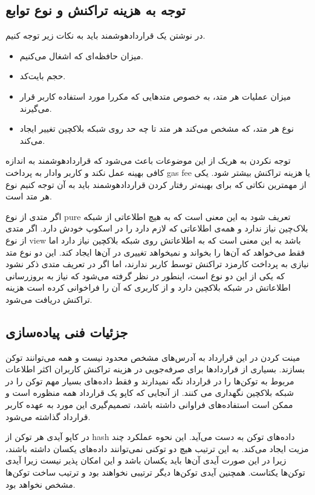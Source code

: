 \subsection{توجه به هزینه تراکنش و نوع توابع}
در نوشتن یک قراردادهوشمند باید به نکات زیر توجه کنیم.
\begin{itemize}
  \item
میزان حافظه‌ای که اشغال می‌کنیم.
  \item
حجم بایت‌کد.
  \item
میزان عملیات هر متد، به خصوص متدهایی که مکررا مورد استفاده کاربر قرار می‌گیرند.
  \item
نوع هر متد، که مشخص می‌کند هر متد تا چه حد روی شبکه بلاکچین تغییر ایجاد می‌کند.
\end{itemize}

توجه نکردن به هریک از این موضوعات باعث می‌شود که قراردادهوشمند به اندازه کافی بهینه عمل نکند و کاربر وادار به پرداخت gas fee یا هزینه تراکنش بیشتر شود. یکی از مهمترین نکاتی که برای بهینه‌تر رفتار کردن قراردادهوشمند باید به آن توجه کنیم نوع هر متد است.

اگر متدی از نوع pure تعریف شود به این معنی است که به هیچ اطلاعاتی از شبکه بلاک‌چین نیاز ندارد و همه‌ی اطلاعاتی که لازم دارد را در اسکوپ
خودش دارد. اگر متدی از نوع view باشد به این معنی است که به اطلاعاتش روی شبکه بلاکچین نیاز دارد اما فقط می‌خواهد که آن‌ها را بخواند و نمیخواهد تغییری در آن‌ها ایجاد کند. این دو نوع متد نیازی به پرداخت کارمزد تراکنش توسط کاربر ندارند، اما اگر در تعریف متدی ذکر نشود که یکی از این دو نوع است، اینطور در نظر گرفته می‌شود که نیاز به بروزرسانی اطلاعاتش در شبکه بلاکچین دارد و از کاربری که آن را فراخوانی کرده است هزینه تراکنش دریافت می‌شود.


\subsection{جزئیات فنی پیاده‌سازی}
مینت کردن در این قرارداد به آدرس‌های مشخص محدود نیست و همه می‌توانند توکن بسازند. بسیاری از قراردادها برای صرفه‌جویی در هزینه تراکنش کاربران اکثر اطلاعات مربوط به توکن‌ها را در قرارداد نگه نمیدارند و فقط داده‌های بسیار مهم توکن را در شبکه بلاکچین نگهداری می کنند. از آنجایی که کاپو یک قرارداد همه منظوره است و ممکن است استفاده‌های فراوانی داشته باشد، تصمیم‌گیری این مورد به عهده کاربر قرارداد گذاشته می‌شود.

در کاپو آیدی هر توکن از hash داده‌های توکن به دست می‌آید. این نحوه عملکرد چند مزیت ایجاد می‌کند. به این ترتیب هیچ دو توکنی نمی‌توانند داده‌های یکسان داشته باشند، زیرا در این صورت آیدی آن‌ها باید یکسان باشد و این امکان پذیر نیست زیرا آیدی توکن‌ها یکتاست. همچنین آیدی توکن‌ها دیگر ترتیبی نخواهند بود و ترتیب ساخت توکن‌ها مشخص نخواهد بود.

